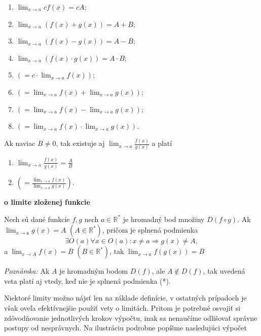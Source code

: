\begin{multicols}{2}
\begin{enumerate}[label=]
    \item $\lim_{x \rightarrow a} cf(x)=cA$;
    \item $\lim_{x \rightarrow a} (f(x)+g(x))=A+B$;
    \item $\lim_{x \rightarrow a} (f(x)-g(x))=A-B$;
    \item $\lim_{x \rightarrow a} (f(x) \cdot g(x))=A \cdot B$;
    \item $(=c \cdot \lim_{x \rightarrow a} f(x))$;
    \item $(=\lim_{x \rightarrow a} f(x)+\lim_{x \rightarrow a} g(x))$;
    \item $(=\lim_{x \rightarrow a} f(x)-\lim_{x \rightarrow a} g(x))$;
    \item $(=\lim_{x \rightarrow a} f(x) \cdot \lim_{x \rightarrow a} g(x))$.
\end{enumerate}
\end{multicols}
Ak naviac $B \neq 0$, tak existuje aj $\lim_{x \rightarrow a} \frac{f(x)}{g(x)}$ a platí 

\begin{multicols}{2}
\begin{enumerate}[label=]
\item $\lim_{x \rightarrow a} \frac{f(x)}{g(x)}=\frac{A}{B}$
\item $(=\frac{\lim_{x \rightarrow a} f(x)}{\lim_{x \rightarrow a} g(x)})$.
\end{enumerate}
\end{multicols}

\begin{veta}
\textbf{o limite zloženej funkcie}

Nech sú dané funkcie $f,g$ nech $a \in \mathbb{R^*}$ je hromadný bod množiny $D(f \circ g)$. Ak $\lim_{x \rightarrow a} g(x)=A$ $(A \in \mathbb{R^*})$, pričom je splnená podmienka 
$$\exists O(a)\forall x \in O(a): x \neq a \Rightarrow g(x) \neq A,$$
a $\lim_{x \rightarrow A} f(x)=B$  $(B \in \mathbb{R^*})$, tak $\lim_{x \rightarrow a} f(g(x))=B$
\end{veta}

\textit{Poznámka:}
Ak $A$ je hromadným bodom $D(f)$, ale $A \notin D(f)$, tak uvedená veta platí aj vtedy, keď nie je splnená podmienka (*).


Niektoré limity možno nájsť len na základe definície, v ostatných prípadoch je však oveľa efektívnejšie použiť vety o limitách. Pritom je potrebné osvojiť si zdôvodňovanie jednotlivých krokov výpočtu, inak sa nenaučíme odlišovať správne postupy od nesprávnych. Na ilustráciu podrobne popíšme nasledujúci výpočet

